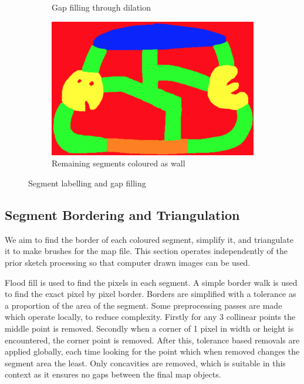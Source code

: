 \documentclass[conference]{IEEEtran}
\begin{document}
\begin{figure}[h]
\begin{subfigure}[b]{0.24\textwidth}
         \caption{Gap filling through dilation}
         \label{fig:l3}
     \end{subfigure}
     \hfill
     \begin{subfigure}[b]{0.24\textwidth}
         \centering
         \includegraphics[width=\textwidth]{l4}
         \caption{Remaining segments coloured as wall}
         \label{fig:l4}
     \end{subfigure}
        \caption{Segment labelling and gap filling}
        \label{fig:labelling}
\end{figure}

\subsection{Segment Bordering and Triangulation}

We aim to find the border of each coloured segment, simplify it, and triangulate it to make brushes for the map file. This section operates independently of the prior sketch processing so that computer drawn images can be used.

Flood fill is used to find the pixels in each segment. A simple border walk is used to find the exact pixel by pixel border. Borders are simplified with a tolerance as a proportion of the area of the segment. Some preprocessing passes are made which operate locally, to reduce complexity. Firstly for any 3 collinear points the middle point is removed. Secondly when a corner of 1 pixel in width or height is encountered, the corner point is removed. After this, tolerance based removals are applied globally, each time looking for the point which when removed changes the segment area the least. Only concavities are removed, which is suitable in this context as it ensures no gaps between the final map objects.
\end{document}
